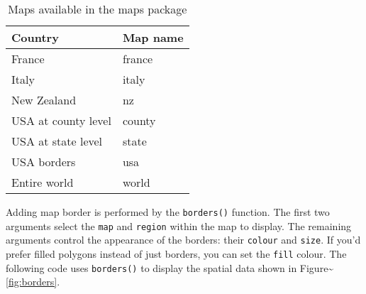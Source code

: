 \begin{table}
  \begin{center}
  \begin{tabular}{ll}
    \toprule
    Country & Map name \\
    \midrule
    France & france \\
    Italy & italy \\
    New Zealand & nz \\
    USA at county level & county \\
    USA at state level & state \\
    USA borders & usa \\
    Entire world & world \\ 
    \bottomrule
  \end{tabular}
  \end{center}
  \caption{Maps available in the maps package}
  \label{tbl:maps}
\end{table}

Adding map border is performed by the \texttt{borders()} function. The
first two arguments select the \texttt{map} and \texttt{region} within
the map to display. The remaining arguments control the appearance of
the borders: their \texttt{colour} and \texttt{size}. If you'd prefer
filled polygons instead of just borders, you can set the \texttt{fill}
colour. The following code uses \texttt{borders()} to display the
spatial data shown in Figure\textasciitilde{}\ref{fig:borders}.
 

\begin{Shaded}
\begin{Highlighting}[]
\StringTok{ }\StringTok{ }\NormalTok{)}
 \StringTok{ }\NormalTok{(}\NormalTok{, } \NormalTok{)}

\StringTok{ }\NormalTok{)}
\StringTok{  }\NormalTok{(}\NormalTok{, }\NormalTok{, } \NormalTok{) +}
\StringTok{  }\NormalTok{(} \NormalTok{)}
\end{Highlighting}
\end{Shaded}

